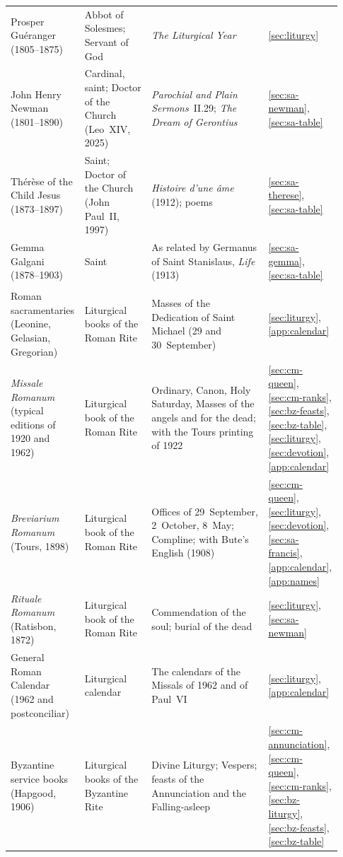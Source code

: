 \begin{longtable}{@{}>{\raggedright\arraybackslash}p{0.21\linewidth}>{\raggedright\arraybackslash}p{0.20\linewidth}>{\raggedright\arraybackslash}p{0.35\linewidth}>{\raggedright\arraybackslash}p{0.17\linewidth}@{}}
Prosper Gu\'eranger (1805--1875) & Abbot of Solesmes; Servant of God & \emph{The Liturgical Year} & \ref{sec:liturgy}\\
John Henry Newman (1801--1890) & Cardinal, saint; Doctor of the Church (Leo~XIV, 2025) & \emph{Parochial and Plain Sermons}~II.29; \emph{The Dream of Gerontius} & \ref{sec:sa-newman}, \ref{sec:sa-table}\\
Th\'er\`ese of the Child Jesus (1873--1897) & Saint; Doctor of the Church (John Paul~II, 1997) & \emph{Histoire d'une \^ame} (1912); poems & \ref{sec:sa-therese}, \ref{sec:sa-table}\\
Gemma Galgani (1878--1903) & Saint & As related by Germanus of Saint Stanislaus, \emph{Life} (1913) & \ref{sec:sa-gemma}, \ref{sec:sa-table}\\
\addlinespace[4pt]
\multicolumn{4}{@{}l}{\textbf{Liturgical books and prayer collections}}\\*
\addlinespace[2pt]
Roman sacramentaries (Leonine, Gelasian, Gregorian) & Liturgical books of the Roman Rite & Masses of the Dedication of Saint Michael (29 and 30~September) & \ref{sec:liturgy}, \ref{app:calendar}\\
\emph{Missale Romanum} (typical editions of 1920 and 1962) & Liturgical book of the Roman Rite & Ordinary, Canon, Holy Saturday, Masses of the angels and for the dead; with the Tours printing of 1922 & \ref{sec:cm-queen}, \ref{sec:cm-ranks}, \ref{sec:bz-feasts}, \ref{sec:bz-table}, \ref{sec:liturgy}, \ref{sec:devotion}, \ref{app:calendar}\\
\emph{Breviarium Romanum} (Tours, 1898) & Liturgical book of the Roman Rite & Offices of 29~September, 2~October, 8~May; Compline; with Bute's English (1908) & \ref{sec:cm-queen}, \ref{sec:liturgy}, \ref{sec:devotion}, \ref{sec:sa-francis}, \ref{app:calendar}, \ref{app:names}\\
\emph{Rituale Romanum} (Ratisbon, 1872) & Liturgical book of the Roman Rite & Commendation of the soul; burial of the dead & \ref{sec:liturgy}, \ref{sec:sa-newman}\\
General Roman Calendar (1962 and postconciliar) & Liturgical calendar & The calendars of the Missals of 1962 and of Paul~VI & \ref{sec:liturgy}, \ref{app:calendar}\\
Byzantine service books (Hapgood, 1906) & Liturgical books of the Byzantine Rite & Divine Liturgy; Vespers; feasts of the Annunciation and the Falling-asleep & \ref{sec:cm-annunciation}, \ref{sec:cm-queen}, \ref{sec:cm-ranks}, \ref{sec:bz-liturgy}, \ref{sec:bz-feasts}, \ref{sec:bz-table}\\

\end{longtable}
